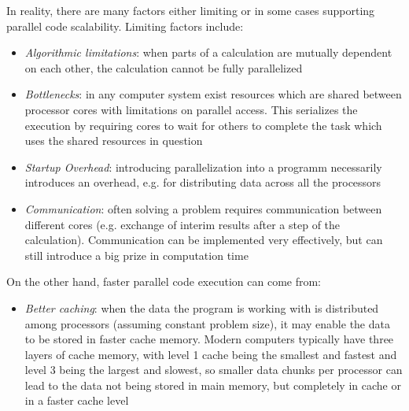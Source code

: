 \documentclass[main.tex]{subfiles}
\begin{document}
In reality, there are many factors either limiting or in some cases supporting parallel code scalability. Limiting factors include:
\begin{itemize}
    \item \emph{Algorithmic limitations}: when parts of a calculation are mutually dependent on each other, the calculation cannot be fully parallelized
    \item \emph{Bottlenecks}: in any computer system exist resources which are shared between processor cores with limitations on parallel access. This serializes the execution by requiring cores to wait for others to complete the task which uses the shared resources in question
    \item \emph{Startup Overhead}: introducing parallelization into a programm necessarily introduces an overhead, e.g. for distributing data across all the processors
    \item \emph{Communication}: often solving a problem requires communication between different cores (e.g. exchange of interim results after a step of the calculation). Communication can be implemented very effectively, but can still introduce a big prize in computation time
\end{itemize}
On the other hand, faster parallel code execution can come from:
\begin{itemize}
    \item \emph{Better caching}: when the data the program is working with is distributed among processors (assuming constant problem size), it may enable the data to be stored in faster cache memory. Modern computers typically have three layers of cache memory, with level 1 cache being the smallest and fastest and level 3 being the largest and slowest, so smaller data chunks per processor can lead to the data not being stored in main memory, but completely in cache or in a faster cache level
\end{itemize}

\section{\QE}
\end{document}
